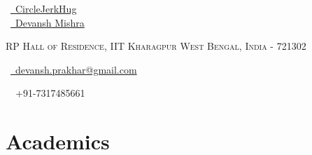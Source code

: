 \documentclass[a4paper,10pt]{extarticle} %
\begin{document}
\pagestyle{empty} %


\begin{multicols}{3}
\normalsize \faGithub\ {\href{https://github.com/CircleJerkHug}{\    CircleJerkHug}}\\
\normalsize  \faLinkedinSquare\ {\href{https://www.linkedin.com/in/devansh-mishra-b3040453/}{\ Devansh Mishra}}\\
\columnbreak
\normalsize\par{\centering{\huge\textsc{\textcolor{primary}{Devansh Mishra}}}\par} %
\par{\centering\normalsize {\textsc{RP Hall of Residence, IIT Kharagpur    West Bengal, India - 721302}}\hfill\par}
\columnbreak
\raggedright\hfill\normalsize \faEnvelope\ {\href{mailto:devansh.prakhar@gmail.com}{\  devansh.prakhar@gmail.com}}\\
\raggedright\hfill{\faPhone\ \  +91-7317485661}
\end{multicols}
\vspace{-0.4 cm}


\vspace{-0.4cm}
\section{\textcolor{primary}{Academics}}
\end{document}
